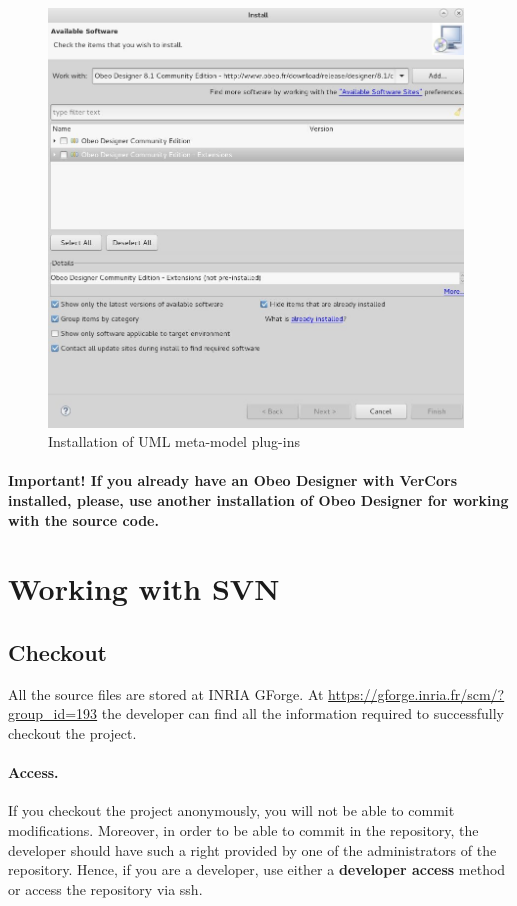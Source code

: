 \documentclass[12pt]{article}
\begin{document}
\begin{figure}
\centering
    \includegraphics[width=11cm]{draws/install-uml.jpg}
 \caption{Installation of UML meta-model plug-ins}
  \label{fig:install-uml}
\end{figure}

\paragraph{Important! If you already have an Obeo Designer with VerCors installed, please, use another installation of Obeo Designer for working with the source code.}

\section{Working with SVN}
\subsection{Checkout}

All the source files are stored at INRIA GForge. At \url{https://gforge.inria.fr/scm/?group_id=193} the developer can find all the information required to successfully checkout the project.

\paragraph{Access.} If you checkout the project anonymously, you will not be able to commit modifications. Moreover, in order to be able to commit in the repository, the developer should have such a right provided by one of the administrators of the repository. Hence, if you are a developer, use either a \textbf{developer access} method or access the repository via ssh.
\end{document}
